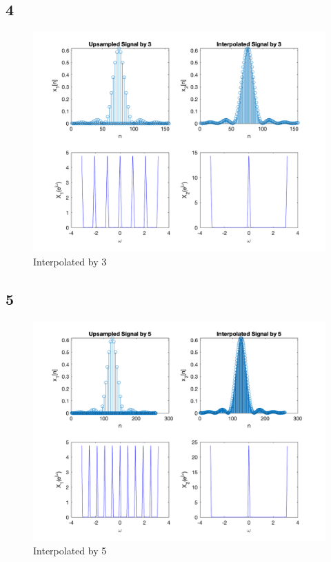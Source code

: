 \documentclass{article}
\begin{document}

\subsection*{4}

\begin{figure}[H]
    \centering
    \includegraphics[scale=0.4]{Interpolated 3.png}
    \caption{Interpolated by 3}
    \label{Interpolated by 3}
\end{figure}


\subsection*{5}

\begin{figure}[H]
    \centering
    \includegraphics[scale=0.4]{Interpolated 5.png}
    \caption{Interpolated by 5}
    \label{Interpolated by 5}
\end{figure}
\end{document}
